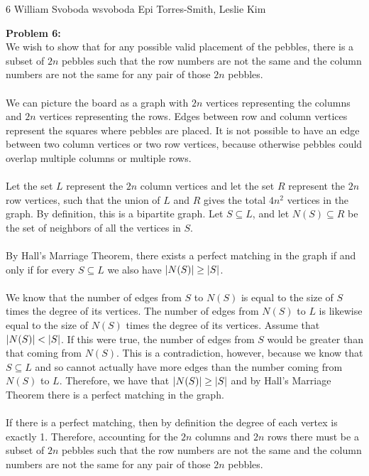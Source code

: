 \documentclass[12pt,letterpaper]{cos340hw}
\begin{document}
           {6}            %
           {William Svoboda}  %
           {wsvoboda}   %
           {Epi Torres-Smith, Leslie Kim} 




\noindent\textbf{Problem 6:}\\
We wish to show that for any possible valid placement of the pebbles, there is a subset of $2n$ pebbles 
such that the row numbers are not the same and the column numbers are not the same for any pair of those 
$2n$ pebbles.\\\\
We can picture the board as a graph with $2n$ vertices representing the columns and $2n$ vertices representing 
the rows. Edges between row and column vertices represent the squares where pebbles are placed. 
It is not possible to have an edge between two column vertices or two row vertices, because otherwise 
pebbles could overlap multiple columns or multiple rows.\\\\
Let the set $L$ represent the $2n$ column vertices and let the set $R$ represent the $2n$ row vertices, such 
that the union of $L$ and $R$ gives the total $4n^2$ vertices in the graph. By definition, this is a bipartite 
graph. Let $S \subseteq L$, and let $N(S) \subseteq R$ be the set of neighbors of all the vertices in $S$.\\\\
By Hall’s Marriage Theorem, there exists a perfect matching in the graph if and only if for
every $S \subseteq L$ we also have $\left| N(S) \right| \ge \left| S \right|$.\\\\
We know that the number of edges from $S$ to $N(S)$ is equal to the size of $S$ times the degree of its 
vertices. The number of edges from $N(S)$ to $L$ is likewise equal to the size of $N(S)$ times the degree 
of its vertices. Assume that $\left| N(S) \right| < \left| S \right|$. If this were true, the number of edges from $S$ would be greater than that 
coming from $N(S)$. This is a contradiction, however, because we know that $S \subseteq L$ and so cannot 
actually have more edges than the number coming from $N(S)$ to $L$. Therefore, we have that 
$\left| N(S) \right| \ge \left| S \right|$ and by Hall's Marriage Theorem there is a perfect matching in the graph.\\\\
If there is a perfect matching, then by definition the degree of each vertex is exactly 1. Therefore, accounting 
for the  $2n$ columns and $2n$ rows there must be a subset of $2n$ pebbles such that the row numbers 
are not the same and the column numbers are not the same for any pair of those $2n$ pebbles.

\end{document}
